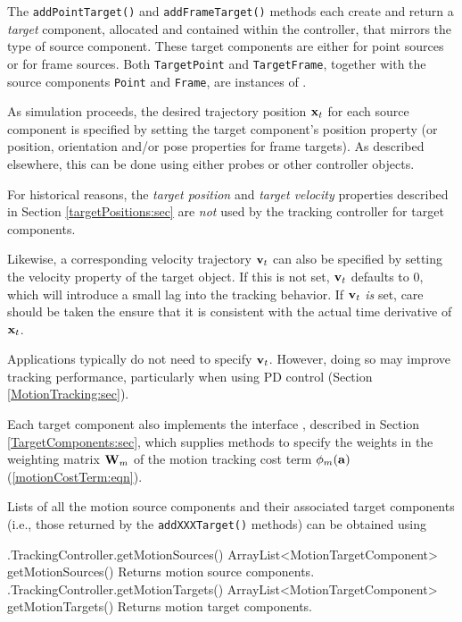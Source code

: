 The {\tt addPointTarget()} and {\tt addFrameTarget()} methods each create and
return a {\it target} component, allocated and contained within the controller,
that mirrors the type of source component.  These target components are
either  for point sources or
 for frame sources.
Both {\tt TargetPoint} and {\tt TargetFrame}, together with the source
components {\tt Point} and {\tt Frame}, are instances of
.

As simulation proceeds, the desired trajectory position ${\bf x}_t$ for each source
component is specified by setting the target component's {\sf position}
property (or {\sf position}, {\sf orientation} and/or {\sf pose} properties for
frame targets). As described elsewhere, this can be done using either probes
or other controller objects.

\begin{sideblock}
For historical reasons, the {\it target position} and {\it target velocity}
properties described in Section \ref{targetPositions:sec} are {\it not} used by
the tracking controller for target components.
\end{sideblock}

Likewise, a corresponding velocity trajectory ${\bf v}_t$ can also be specified by
setting the {\sf velocity} property of the target object.  If this is not set,
${\bf v}_t$ defaults to 0, which will introduce a small lag into the tracking
behavior. If ${\bf v}_t$ {\it is} set, care should be taken the ensure that it is
consistent with the actual time derivative of ${\bf x}_t$.

\begin{sideblock}
Applications typically do not need to specify ${\bf v}_t$. However, doing so may
improve tracking performance, particularly when using PD control
(Section \ref{MotionTracking:sec}).
\end{sideblock}

Each target component also implements the interface
, described in
Section \ref{TargetComponents:sec}, which supplies methods to specify the
weights in the weighting matrix ${\bf W}_m$ of the motion tracking cost term
$\phi_m({\bf a})$ (\ref{motionCostTerm:eqn}).

Lists of all the motion source components and their associated target
components (i.e., those returned by the {\tt addXXXTarget()} methods) can be
obtained using
%
\begin{methodtable}{0.58}{0.42}
\midline
%
\methodentry
{\inverse.TrackingController.getMotionSources()}%
{ArrayList<MotionTargetComponent> getMotionSources()}%
{Returns motion source components.}%
%
\methodentry
{\inverse.TrackingController.getMotionTargets()}%
{ArrayList<MotionTargetComponent> getMotionTargets()}%
{Returns motion target components.}%
%
\midline
\end{methodtable}
%

